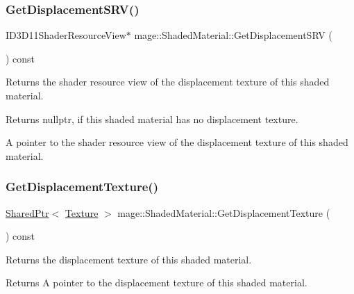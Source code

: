 \subsubsection{\texorpdfstring{Get\+Displacement\+S\+R\+V()}{GetDisplacementSRV()}}
{\footnotesize\ttfamily I\+D3\+D11\+Shader\+Resource\+View$\ast$ mage\+::\+Shaded\+Material\+::\+Get\+Displacement\+S\+RV (\begin{DoxyParamCaption}{ }\end{DoxyParamCaption}) const\hspace{0.3cm}{\ttfamily [noexcept]}}

Returns the shader resource view of the displacement texture of this shaded material.

\begin{DoxyReturn}{Returns}
{\ttfamily nullptr}, if this shaded material has no displacement texture. 

A pointer to the shader resource view of the displacement texture of this shaded material. 
\end{DoxyReturn}
\hypertarget{structmage_1_1_shaded_material_acf3273d75933ca238075150dd7cc7dca}{}\label{structmage_1_1_shaded_material_acf3273d75933ca238075150dd7cc7dca} 
\subsubsection{\texorpdfstring{Get\+Displacement\+Texture()}{GetDisplacementTexture()}}
{\footnotesize\ttfamily \hyperlink{namespacemage_a1e01ae66713838a7a67d30e44c67703e}{Shared\+Ptr}$<$ \hyperlink{classmage_1_1_texture}{Texture} $>$ mage\+::\+Shaded\+Material\+::\+Get\+Displacement\+Texture (\begin{DoxyParamCaption}{ }\end{DoxyParamCaption}) const\hspace{0.3cm}{\ttfamily [noexcept]}}

Returns the displacement texture of this shaded material.

\begin{DoxyReturn}{Returns}
A pointer to the displacement texture of this shaded material. 
\end{DoxyReturn}
\hypertarget{structmage_1_1_shaded_material_adff98fa9d3ace697033106e04d09ac98}{}\label{structmage_1_1_shaded_material_adff98fa9d3ace697033106e04d09ac98} 
